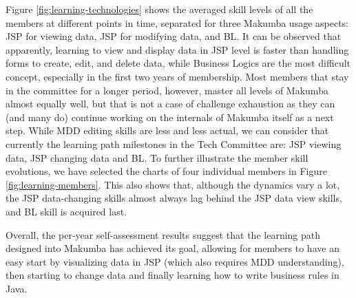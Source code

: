 \documentclass{llncs}
\begin{document}
Figure \ref{fig:learning-technologies} shows the averaged skill levels of all the members at different points in time, separated for three Makumba usage aspects: JSP for viewing data, JSP for modifying data, and BL. It can be observed that apparently, learning to view and display data in JSP level is faster than handling forms to create, edit, and delete data, while Business Logics are the most difficult concept, especially in the first two years of membership. Most members that stay in the committee for a longer period, however, master all levels of Makumba almost equally well, but that is not a case of challenge exhaustion as they can (and many do) continue working on the internals of Makumba itself  as a next step. While MDD editing skills are less and less actual, we can consider that currently the learning path milestones in the Tech Committee are: JSP viewing data, JSP changing data and BL. To further illustrate the member skill evolutions, we have selected the charts of four individual members in Figure \ref{fig:learning-members}. This also shows that, although the dynamics vary a lot, the JSP data-changing skills almost always lag behind the JSP data view skills, and BL skill is acquired last. 

Overall, the per-year self-assessment results suggest that the learning path designed into Makumba has achieved its goal, allowing for members to have an easy start by visualizing data in JSP (which also requires MDD understanding), then starting to change data and finally learning how to write business rules in Java.
\end{document}
